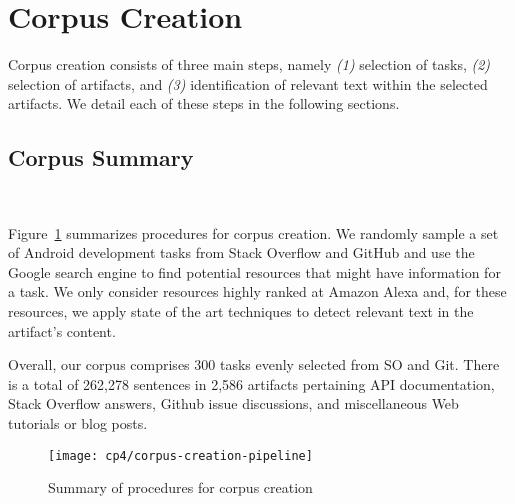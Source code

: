 \section{Corpus Creation}
\label{cp4:corpus-creation}

Corpus creation consists of three main steps, namely \textit{(1)} selection of tasks, \textit{(2)} selection of artifacts, and \textit{(3)} identification of relevant text within the selected artifacts. We detail each of these steps in the following sections.









\subsection{Corpus Summary}
\textcolor{white}{force ident} %



Figure~\ref{fig:corpus-creation-pipeline} summarizes procedures for corpus creation.
We randomly sample a set of Android development tasks from Stack Overflow and GitHub
and use the Google search engine to find potential resources that might have
information for a task. We only consider resources highly ranked at Amazon Alexa and, for these resources, we apply state of the art techniques to detect relevant text in the artifact's content.



Overall, our corpus comprises 300 tasks evenly selected from SO and Git. 
There is a total of 262,278 sentences in 2,586 artifacts pertaining API documentation, Stack Overflow answers, Github issue discussions, and miscellaneous Web tutorials or blog posts. 



\begin{figure}
    \centering
    \texttt{[image: cp4/corpus-creation-pipeline]}
    \caption{Summary of procedures for corpus creation}
    \label{fig:corpus-creation-pipeline}
\end{figure}


